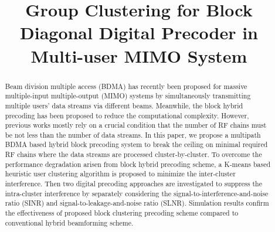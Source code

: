 \documentclass[conference]{IEEEtran}
\begin{document}
\title{Group Clustering for Block Diagonal Digital Precoder in Multi-user MIMO System}
\author{}


\maketitle \thispagestyle{plain}
\begin{abstract}
Beam division multiple access (BDMA) has recently been proposed for massive multiple-input multiple-output (MIMO) systems by simultaneously transmitting multiple users' data streams via different beams. Meanwhile, the block hybrid precoding has been proposed to reduce the computational complexity. However, previous works mostly rely on a crucial condition that the number of RF chains must be not less than the number of data streams. In this paper, we propose a multipath BDMA based hybrid block precoding system to break the ceiling on minimal required RF chains where the data streams are processed cluster-by-cluster. To overcome the performance degradation arisen from block hybrid precoding scheme, a K-means based heuristic user clustering algorithm is proposed to minimize the inter-cluster interference. Then two digital precoding approaches are investigated to suppress the intra-cluster interference by separately considering the signal-to-interference-and-noise ratio (SINR) and signal-to-leakage-and-noise ratio (SLNR).   Simulation results confirm the effectiveness of proposed block clustering precoding scheme compared to conventional hybrid beamforming scheme.
\end{abstract}
\end{document}
